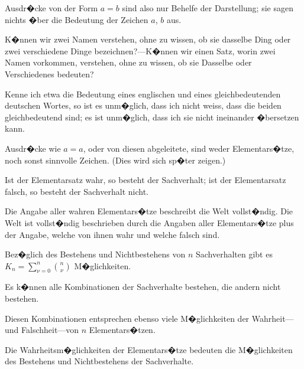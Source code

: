 {Ausdr�cke von der Form \glqq{}$a = b$\grqq{} sind also nur
Behelfe der Darstellung; sie sagen nichts �ber die
Bedeutung der Zeichen \glqq{}$a$\grqq{}, \glqq{}$b$\grqq{} aus.}


{K�nnen wir zwei Namen verstehen, ohne zu
wissen, ob sie dasselbe Ding oder zwei verschiedene
Dinge bezeichnen?---K�nnen wir einen Satz,
worin zwei Namen vorkommen, verstehen, ohne
zu wissen, ob sie Dasselbe oder Verschiedenes
bedeuten?

Kenne ich etwa die Bedeutung eines englischen
und eines gleichbedeutenden deutschen Wortes, so
ist es unm�glich, dass ich nicht weiss, dass die
beiden gleichbedeutend sind; es ist unm�glich,
dass ich sie nicht ineinander �bersetzen kann.

Ausdr�cke wie \glqq{}$a = a$\grqq{}, oder von diesen abgeleitete,
sind weder Elementars�tze, noch sonst sinnvolle
Zeichen. (Dies wird sich sp�ter zeigen.)}


{Ist der Elementarsatz wahr, so besteht der
Sachverhalt; ist der Elementarsatz falsch, so besteht
der Sachverhalt nicht.}


{Die Angabe aller wahren Elementars�tze beschreibt
die Welt vollst�ndig. Die Welt ist
vollst�ndig beschrieben durch die Angaben aller
Elementars�tze plus der Angabe, welche von ihnen
wahr und welche falsch sind.}


{Bez�glich des Bestehens und Nichtbestehens von
\enlargethispage{9pt} %
$n$ Sachverhalten gibt es $K_{n} = \sum\limits_{\nu = 0}^n\binom{n}{\nu}$ M�glichkeiten.

Es k�nnen alle Kombinationen der Sachverhalte
bestehen, die andern nicht bestehen.}


{Diesen Kombinationen entsprechen ebenso viele
M�glichkeiten der Wahr\-heit---und Falschheit---von
$n$ Elementars�tzen.}


{Die Wahrheitsm�glichkeiten der Elementars�tze
bedeuten die M�glichkeiten des Bestehens und
Nichtbestehens der Sachverhalte.}


